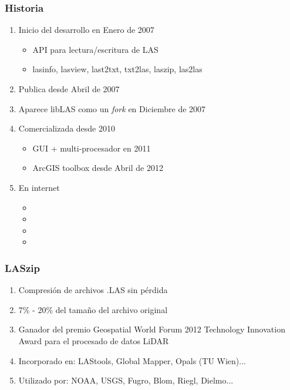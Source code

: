 \begin{frame}
  \frametitle{Historia}
  \begin{enumerate}
    \item Inicio del desarrollo en Enero de 2007
      \begin{itemize}
        \item API para lectura/escritura de LAS
        \item lasinfo, lasview, last2txt, txt2las, laszip, las2las
      \end{itemize}
    \item Publica desde Abril de 2007
    \item Aparece libLAS como un \emph{fork} en Diciembre de 2007
    \item Comercializada desde 2010
      \begin{itemize}
        \item GUI + multi-procesador en 2011
        \item ArcGIS toolbox desde Abril de 2012
      \end{itemize}
    \item En internet
      \begin{itemize}
        \item {}
        \item {}
        \item {}
        \item {}
      \end{itemize}
  \end{enumerate}
\end{frame}
\begin{frame}
  \frametitle{LASzip}
  \begin{enumerate}
    \item Compresión de archivos .LAS sin \alert{pérdida}
    \item 7\% - 20\% del tamaño del archivo original
    \item Ganador del premio Geospatial World Forum 2012 Technology 
      Innovation Award para el procesado de datos LiDAR
    \item Incorporado en: LAStools, Global Mapper, Opals (TU Wien)...
    \item Utilizado por: NOAA, USGS, Fugro, Blom, Riegl, Dielmo...
    \laszip
  \end{enumerate}
\end{frame}

